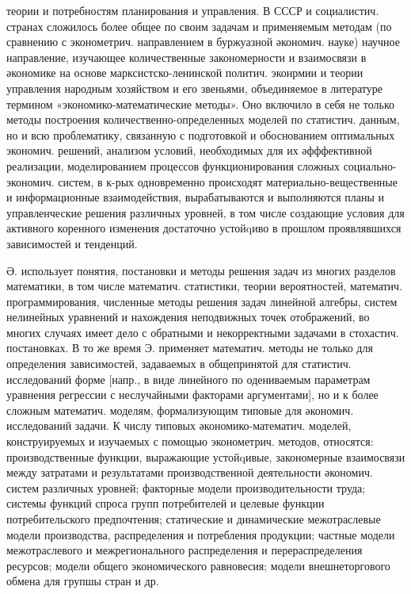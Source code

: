 \documentclass[10pt]{article}
\begin{document}
теории и потребностям планирования и управления. В СССР и социалистич. странах сложилось более общее по своим задачам и применяемым методам (по сравнению с эконометрич. направлением в буржуазной әкономич. науке) научное направление, изучающее количественные закономерности и взаимосвязи в әкономике на основе марксистско-ленинской политич. эконрмии и теории управления народным хозяйством и его звеньями, объединяемое в литературе термином «экономико-математические методы». Оно включило в себя не только методы построения количественно-определенных моделей по статистич. данным, но и всю проблематику, связанную с подготовкой и обоснованием оптимальных экономич. решений, анализом условий, необходимых для их әфффективной реализации, моделированием процессов функционирования сложных социально-экономич. систем, в к-рых одновременно происходят материально-вещественные и информационные взаимодействия, вырабатываются и выполняются планы и управленческие решения различных уровней, в том числе создающие условия для активного коренного изменения достаточно устойqиво в прошлом проявлявшихся зависимостей и тенденций.



Ә. использует понятия, постановки и методы решения задач из многих разделов математики, в том числе математич. статистики, теории вероятностей, математич. программирования, численные методы решения задач линейной алгебры, систем нелинейных уравнений и нахождения неподвижных точек отображений, во многих случаях имеет дело с обратными и некорректными задачами в стохастич. постановках. В то же время Э. применяет математич. методы не только для определения зависимостей, задаваемых в общепринятой для статистич. исследований форме [напр., в виде линейного по одениваемым параметрам уравнения регрессии с неслучайными факторами аргументами], но и к более сложным математич. моделям, формализующим типовые для әкономич. исследований задачи. К числу типовых әкономико-математич. моделей, конструируемых и изучаемых с помощью эконометрич. методов, относятся: производственные функции, выражающие устойqивые, закономерные взаимосвязи между затратами и результатами производственной деятельности әкономич. систем различных уровней; факторные модели производительности труда; системы функций спроса групп потребителей и целевые функции потребительского предпочтения; статические и динамические межотраслевые модели производства, распределения и потребления продукции; частные модели межотраслевого и межрегионального распределения и перераспределения ресурсов; модели общего экономического равновесия; модели внешнеторгового обмена для групшы стран и др.
\end{document}

